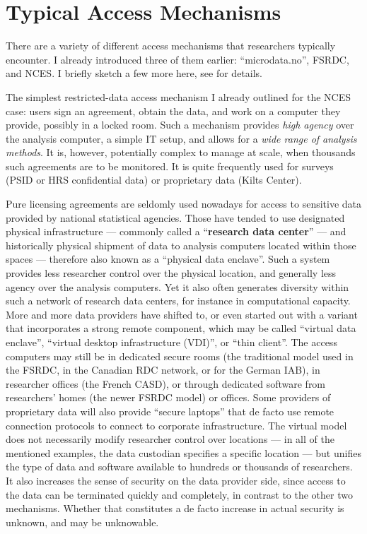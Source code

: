 \section{Typical Access Mechanisms}
\label{sec:typical_access}

There are a variety of different access mechanisms that researchers typically encounter. I already introduced three of them earlier: ``microdata.no'', FSRDC, and NCES.  I briefly sketch a few more here, see \cite{shen_physically_2021} for details. 

The simplest restricted-data access mechanism I already outlined for the NCES case: users sign an agreement, obtain the data, and work on a computer they provide, possibly in a locked room. Such a mechanism provides \textit{high agency} over the analysis computer, a simple IT setup, and allows for a \textit{wide range of analysis methods}. It is, however, potentially complex to manage at scale, when thousands such agreements are to be monitored. It is quite frequently used for surveys (PSID or HRS confidential data) or  proprietary data (Kilts Center). 

Pure licensing agreements are seldomly used nowadays for access to sensitive data provided by national statistical agencies. Those have tended to use designated physical infrastructure --- commonly called a ``\textbf{research data center}'' --- and historically physical shipment of data to analysis computers located within those spaces \cite{currie2015social}  --- therefore also known as a ``physical data enclave''. Such a system provides less researcher control over the physical location, and generally less agency over the analysis computers. Yet it also often generates diversity within such a network of research data centers, for instance in computational capacity. More and more data providers have shifted to, or even started out with a variant that incorporates a strong remote component, which may be called ``virtual data enclave'', ``virtual desktop infrastructure (VDI)'', or ``thin client''. The access computers may still be in dedicated secure rooms (the traditional model used in the FSRDC, in the Canadian RDC network, or for the German \ac{IAB}), in researcher offices (the French \acf{CASD}), or through dedicated software from researchers' homes (the newer FSRDC model) or offices. Some providers of proprietary data will also provide ``secure laptops'' that de facto use remote connection protocols to connect to corporate infrastructure. The virtual model does not necessarily modify researcher control over locations --- in all of the mentioned examples, the data custodian specifies a specific location --- but unifies the type of data and software available to hundreds or thousands of researchers. It also increases the sense of security on the data provider side, since access to the data can be terminated quickly and completely, in contrast to the other two mechanisms. Whether that constitutes a de facto increase in actual security is unknown, and may be unknowable. 

